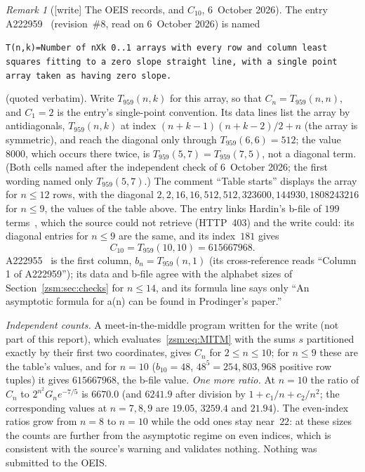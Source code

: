 \documentclass[11pt]{article}
\theoremstyle{definition}\newtheorem{definition}[theorem]{Definition}
\theoremstyle{remark}\newtheorem{remark}[theorem]{Remark}
\begin{document}
\begin{remark}[{[write]} The OEIS records, and $C_{10}$, 6~October 2026]\label{zsm:rem:oeisdata}
The entry A222959~\cite{oeis959} (revision~\#8, read on 6~October 2026) is
named
\begin{center}\small
\parbox{0.92\textwidth}{\raggedright\texttt{T(n,k)=Number of nXk 0..1 arrays with every row and column least squares fitting to a zero slope straight line, with a single point array taken as having zero slope.}}
\end{center}
(quoted verbatim). Write $T_{959}(n,k)$ for this array, so that
$C_n=T_{959}(n,n)$, and $C_1=2$ is the entry's single-point convention. Its
data lines list the array by antidiagonals, $T_{959}(n,k)$ at index
$(n+k-1)(n+k-2)/2+n$ (the array is symmetric), and reach the diagonal only
through $T_{959}(6,6)=512$; the value $8000$, which occurs there twice, is
$T_{959}(5,7)=T_{959}(7,5)$, not a diagonal term. \textup{(Both cells named
after the independent check of 6~October 2026; the first wording named only
$T_{959}(5,7)$.)} The comment ``Table starts'' displays
the array for $n\le12$ rows, with the diagonal $2, 2, 16, 16, 512, 512,
323600, 144930, 1808243216$ for $n\le9$, the values of the table above. The
entry links Hardin's b-file of $199$ terms~\cite{bfiles}, which the source
could not retrieve (HTTP~403) and the write could: its diagonal entries for
$n\le9$ are the same, and its index~$181$ gives
\[
 C_{10}=T_{959}(10,10)=615667968 .
\]
A222955~\cite{oeis955} is the first column, $b_n=T_{959}(n,1)$ (its
cross-reference reads ``Column 1 of A222959''); its data and b-file agree
with the alphabet sizes of Section~\ref{zsm:sec:checks} for $n\le14$, and
its formula line says only ``An asymptotic formula for a(n) can be found in
Prodinger's paper.''

\emph{Independent counts.} A meet-in-the-middle program written for the
write (not part of this report), which evaluates~\eqref{zsm:eq:MITM} with
the sums $s$ partitioned exactly by their first two coordinates, gives
$C_n$ for $2\le n\le10$; for $n\le9$ these are the table's values, and for
$n=10$ ($b_{10}=48$, $48^5=254{,}803{,}968$ positive row tuples) it gives
$615667968$, the b-file value. \emph{One more ratio.} At $n=10$ the ratio
of $C_n$ to $2^{n^2}G_ne^{-7/5}$ is $6670.0$ (and $6241.9$ after division
by $1+c_1/n+c_2/n^2$; the corresponding values at $n=7,8,9$ are $19.05$,
$3259.4$ and $21.94$). The even-index ratios grow from $n=8$ to $n=10$
while the odd ones stay near~$22$: at these sizes the counts are further
from the asymptotic regime on even indices, which is consistent with the
source's warning and validates nothing. Nothing was submitted to the OEIS.
\end{remark}
\end{document}
